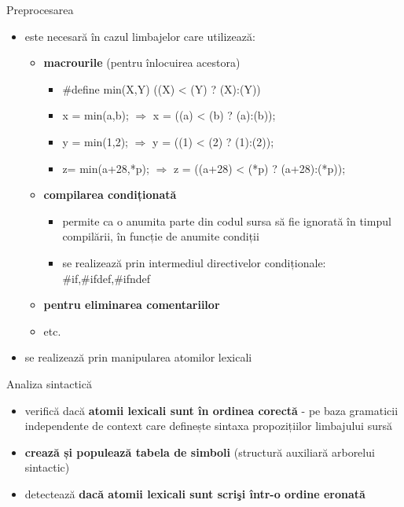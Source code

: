 \documentclass[pdf]{beamer}
\begin{document}
\begin{frame}{Preprocesarea}
\begin{itemize}
\item 
este necesară în cazul limbajelor care utilizează:
\begin{itemize}
\item
\textbf{macrourile} (pentru înlocuirea acestora)
\begin{itemize}
\item \#define min(X,Y) ((X) < (Y) ? (X):(Y))
\item x = min(a,b); $\Longrightarrow$ x = ((a) < (b) ? (a):(b));
\item y = min(1,2); $\Longrightarrow$ y = ((1) < (2) ? (1):(2));
\item z= min(a+28,*p); $\Longrightarrow$ z = ((a+28) < (*p) ? (a+28):(*p));
\end{itemize}

\item
\textbf{compilarea condiționată}
\begin{itemize}
\item
permite ca o anumita parte din codul sursa să fie ignorată în 
timpul compilării, în funcție de anumite condiții
\item
se realizează prin intermediul directivelor condiționale:
\#if,\#ifdef,\#ifndef
\end{itemize}

\item
\textbf{pentru eliminarea comentariilor}
\item
etc.
\end{itemize}

\item 
se realizează prin manipularea atomilor lexicali
\end{itemize}
\end{frame}



\begin{frame}{Analiza sintactică}
\begin{itemize}
\item
verifică dacă \textbf{atomii lexicali sunt în ordinea corectă} - pe baza gramaticii independente de context care definește sintaxa propozițiilor limbajului sursă
\newline

\item
\textbf{crează și populează tabela de simboli} (structură auxiliară arborelui sintactic)
\newline

\item
detectează \textbf{dacă atomii lexicali sunt scrişi într-o ordine eronată}
\newline

\end{itemize}
\end{frame}
\end{document}
